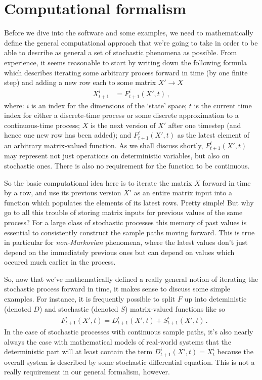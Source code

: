 \documentclass{book}
\begin{document}
\section{\sffamily Computational formalism}

Before we dive into the software and some examples, we need to mathematically define the general computational approach that we're going to take in order to be able to describe as general a set of stochastic phenomena as possible. From experience, it seems reasonable to start by writing down the following formula which describes iterating some arbitrary process forward in time (by one finite step) and adding a new row each to some matrix $X' \rightarrow X$
\begin{align}
X^{i}_{t+1} &= F^{i}_{t+1}(X',t) \,, \label{eq:x-step-def}
\end{align}
where: $i$ is an index for the dimensions of the `state' space; $t$ is the current time index for either a discrete-time process or some discrete approximation to a continuous-time process; $X$ is the next version of $X'$ after one timestep (and hence one new row has been added); and $F^i_{t+1}(X',t)$ as the latest element of an arbitrary matrix-valued function. As we shall discuss shortly, $F^i_{t+1}(X',t)$ may represent not just operations on deterministic variables, but also on stochastic ones. There is also no requirement for the function to be continuous.

So the basic computational idea here is to iterate the matrix $X$ forward in time by a row, and use its previous version $X'$ as an entire matrix input into a function which populates the elements of its latest rows. Pretty simple! But why go to all this trouble of storing matrix inputs for previous values of the same process? For a large class of stochastic processes this memory of past values is essential to consistently construct the sample paths moving forward. This is true in particular for \emph{non-Markovian} phenomena, where the latest values don't just depend on the immediately previous ones but can depend on values which occured much earlier in the process.

So, now that we've mathematically defined a really general notion of iterating the stochastic process forward in time, it makes sense to discuss some simple examples. For instance, it is frequently possible to split $F$ up into deteministic (denoted $D$) and stochastic (denoted $S$) matrix-valued functions like so
\begin{align}
& F^{i}_{t+1}(X',t) = D^{i}_{t+1}(X',t) + S^{i}_{t+1}(X',t) \,.
\end{align}
In the case of stochastic processes with continuous sample paths, it's also nearly always the case with mathematical models of real-world systems that the deterministic part will at least contain the term $D^{i}_{t+1}(X',t) = X^i_t$ because the overall system is described by some stochastic differential equation. This is not a really requirement in our general formalism, however.
\end{document}
